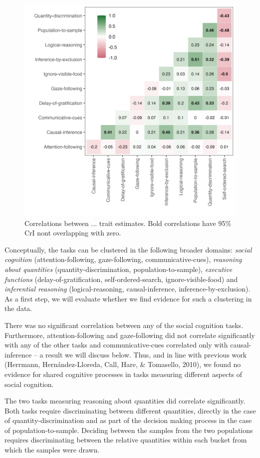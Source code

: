 \documentclass[
  man,floatsintext]{apa6}
\begin{document}
\begin{figure}

{\centering \includegraphics[width=0.7\linewidth]{../visuals/task_level_cor} 

}

\caption{Correlations between ... trait estimates. Bold correlations have 95\% CrI nont overlapping with zero.}\label{fig:figcor}
\end{figure}

Conceptually, the tasks can be clustered in the following broader domains: \emph{social cognition} (attention-following, gaze-following, communicative-cues), \emph{reasoning about quantities} (quantity-discrimination, population-to-sample), \emph{executive functions} (delay-of-gratification, self-ordered-search, ignore-visible-food) and \emph{inferential reasoning} (logical-reasoning, causal-inference, inference-by-exclusion). As a first step, we will evaluate whether we find evidence for such a clustering in the data.

There was no significant correlation between any of the social cognition tasks. Furthermore, attention-following and gaze-following did not correlate significantly with any of the other tasks and communicative-cues correlated only with causal-inference -- a result we will discuss below. Thus, and in line with previous work (Herrmann, Hernández-Lloreda, Call, Hare, \& Tomasello, 2010), we found no evidence for shared cognitive processes in tasks measuring different aspects of social cognition.

The two tasks measuring reasoning about quantities did correlate significantly. Both tasks require discriminating between different quantities, directly in the case of quantity-discrimination and as part of the decision making process in the case of population-to-sample. Deciding between the samples from the two populations requires discriminating between the relative quantities within each bucket from which the samples were drawn.
\end{document}
